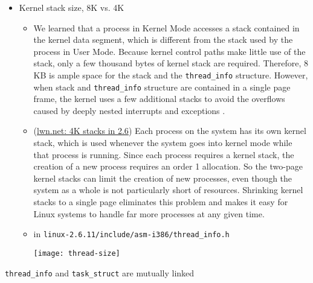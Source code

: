 \begin{itemize}
\item Kernel stack size, 8K vs. 4K
  \begin{itemize}
  \item We learned that a process in Kernel Mode accesses a stack contained in the kernel
    data segment, which is different from the stack used by the process in User
    Mode. Because kernel control paths make little use of the stack, only a few thousand
    bytes of kernel stack are required. Therefore, 8 KB is ample space for the stack and
    the \texttt{thread\_info} structure. However, when stack and \texttt{thread\_info}
    structure are contained in a single page frame, the kernel uses a few additional
    stacks to avoid the overflows caused by deeply nested interrupts and exceptions
    . 
  \item (\href{http://lwn.net/Articles/84583/}{lwn.net: 4K stacks in 2.6})
     Each process on
    the system has its own kernel stack, which is used whenever the system goes into
    kernel mode while that process is running. Since each process requires a kernel stack,
    the creation of a new process requires an order 1 allocation. So the two-page kernel
    stacks can limit the creation of new processes, even though the system as a whole is
    not particularly short of resources. Shrinking kernel stacks to a single page
    eliminates this problem and makes it easy for Linux systems to handle far more
    processes at any given time.
  \item in \texttt{linux-2.6.11/include/asm-i386/thread\_info.h}
    \begin{center}
      \texttt{[image: thread-size]}
    \end{center}
  \end{itemize}
\end{itemize}

\begin{frame}
  \begin{block}{\texttt{thread\_info} and \texttt{task\_struct} are mutually linked}
    \begin{center}
    \end{center}
  \end{block}
\end{frame}


